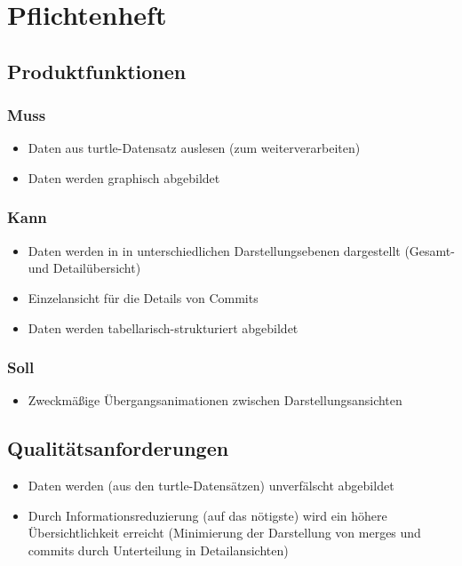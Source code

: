 \documentclass[color, ddc]{tudscrreprt}
\begin{document}
\chapter{Pflichtenheft}

\section{Produktfunktionen}
\subsection{Muss}
\begin{itemize}
\item Daten aus turtle-Datensatz auslesen (zum weiterverarbeiten)
\item Daten werden graphisch abgebildet
\end{itemize}

\subsection{Kann}
\begin{itemize}
\item Daten werden in in unterschiedlichen Darstellungsebenen dargestellt (Gesamt- und Detailübersicht)
\item Einzelansicht für die Details von Commits
\item Daten werden tabellarisch-strukturiert abgebildet
\end{itemize}

\subsection{Soll}
\begin{itemize}
\item Zweckmäßige Übergangsanimationen zwischen Darstellungsansichten
\end{itemize}

\section{Qualitätsanforderungen}
\begin{itemize}
\item Daten werden (aus den turtle-Datensätzen) unverfälscht abgebildet
\item Durch Informationsreduzierung (auf das nötigste) wird ein höhere Übersichtlichkeit erreicht (Minimierung der Darstellung von merges und commits durch Unterteilung in Detailansichten)
\end{itemize}
\end{document}
